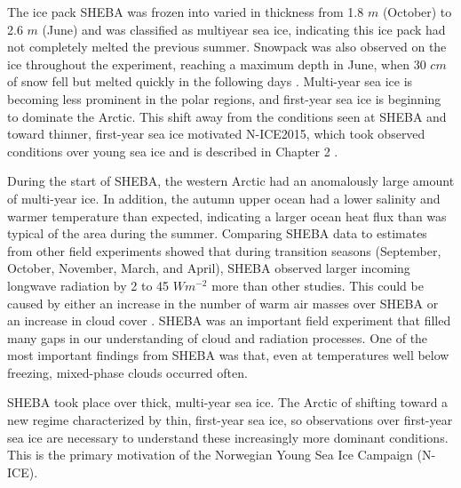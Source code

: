 The ice pack SHEBA was frozen into varied in thickness from 1.8 $m$ (October) to 2.6 $m$ (June) and was classified as multiyear sea ice, indicating this ice pack had not completely melted the previous summer. Snowpack was also observed on the ice throughout the experiment, reaching a maximum depth in June, when 30 $cm$ of snow fell but melted quickly in the following days \citep{uttal:2002}. Multi-year sea ice is becoming less prominent in the polar regions, and first-year sea ice is beginning to dominate the Arctic. This shift away from the conditions seen at SHEBA and toward thinner, first-year sea ice motivated N-ICE2015, which took observed conditions over young sea ice and is described in Chapter 2 \citep{graham:2017}. 

During the start of SHEBA, the western Arctic had an anomalously large amount of multi-year ice. In addition, the autumn upper ocean had a lower salinity and warmer temperature than expected, indicating a larger ocean heat flux than was typical of the area during the summer. Comparing SHEBA data to estimates from other field experiments showed that during transition seasons (September, October, November, March, and April), SHEBA observed larger incoming longwave radiation by 2 to 45 $Wm^{-2}$ more than other studies. This could be caused by either an increase in the number of warm air masses over SHEBA or an increase in cloud cover \citep{persson:2002}. SHEBA was an important field experiment that filled many gaps in our understanding of cloud and radiation processes. One of the most important findings from SHEBA was that, even at temperatures well below freezing, mixed-phase clouds occurred often. 

SHEBA took place over thick, multi-year sea ice. The Arctic of shifting toward a new regime characterized by thin, first-year sea ice, so observations over first-year sea ice are necessary to understand these increasingly more dominant conditions. This is the primary motivation of the Norwegian Young Sea Ice Campaign (N-ICE). 

%

